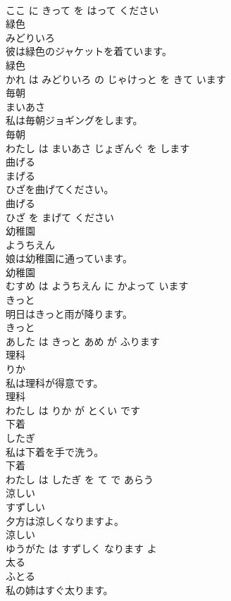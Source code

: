 \documentclass[8pt]{extreport}
\begin{document}
\begin{CJK}{UTF8}{min}
\\	ここ に きって を はって ください			
\\	緑色	
\\	みどりいろ			
\\	彼は緑色のジャケットを着ています。	
\\	緑色 
\\	かれ は みどりいろ の じゃけっと を きて います			
\\	毎朝	
\\	まいあさ			
\\	私は毎朝ジョギングをします。	
\\	毎朝 
\\	わたし は まいあさ じょぎんぐ を します			
\\	曲げる	
\\	まげる			
\\	ひざを曲げてください。	
\\	曲げる 
\\	ひざ を まげて ください			
\\	幼稚園	
\\	ようちえん			
\\	娘は幼稚園に通っています。	
\\	幼稚園 
\\	むすめ は ようちえん に かよって います			
\\	きっと	
\\	明日はきっと雨が降ります。	
\\	きっと 
\\	あした は きっと あめ が ふります			
\\	理科	
\\	りか			
\\	私は理科が得意です。	
\\	理科 
\\	わたし は りか が とくい です			
\\	下着	
\\	したぎ			
\\	私は下着を手で洗う。	
\\	下着 
\\	わたし は したぎ を て で あらう			
\\	涼しい	
\\	すずしい			
\\	夕方は涼しくなりますよ。	
\\	涼しい 
\\	ゆうがた は すずしく なります よ			
\\	太る	
\\	ふとる			
\\	私の姉はすぐ太ります。	

\end{CJK}
\end{document}
